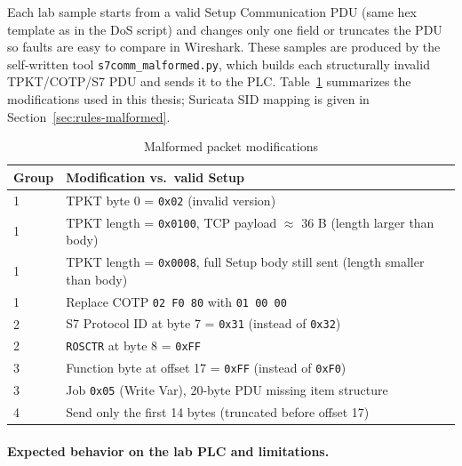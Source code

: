 ﻿\documentclass[../main.tex]{subfiles}
\begin{document}
Each lab sample starts from a valid Setup Communication PDU (same hex template as in the DoS script) and changes only one field or truncates the PDU so faults are easy to compare in Wireshark. These samples are produced by the self-written tool \texttt{s7comm\_malformed.py}, which builds each structurally invalid TPKT/COTP/S7 PDU and sends it to the PLC. Table~\ref{tab:malformed-changes} summarizes the modifications used in this thesis; Suricata SID mapping is given in Section~\ref{sec:rules-malformed}.

\begin{table}[H]
    \centering
    \footnotesize
    \begin{tabular}{|l|l|}
        \hline
        Group & Modification vs.\ valid Setup \\
        \hline
        1 & TPKT byte 0 = \texttt{0x02} (invalid version) \\
        \hline
        1 & TPKT length = \texttt{0x0100}, TCP payload $\approx$ 36 B (length larger than body) \\
        \hline
        1 & TPKT length = \texttt{0x0008}, full Setup body still sent (length smaller than body) \\
        \hline
        1 & Replace COTP \texttt{02 F0 80} with \texttt{01 00 00} \\
        \hline
        2 & S7 Protocol ID at byte 7 = \texttt{0x31} (instead of \texttt{0x32}) \\
        \hline
        2 & \texttt{ROSCTR} at byte 8 = \texttt{0xFF} \\
        \hline
        3 & Function byte at offset 17 = \texttt{0xFF} (instead of \texttt{0xF0}) \\
        \hline
        3 & Job \texttt{0x05} (Write Var), 20-byte PDU missing item structure \\
        \hline
        4 & Send only the first 14 bytes (truncated before offset 17) \\
        \hline
    \end{tabular}
    \caption{Malformed packet modifications}
    \label{tab:malformed-changes}
\end{table}


\paragraph{Expected behavior on the lab PLC and limitations.}
\end{document}
